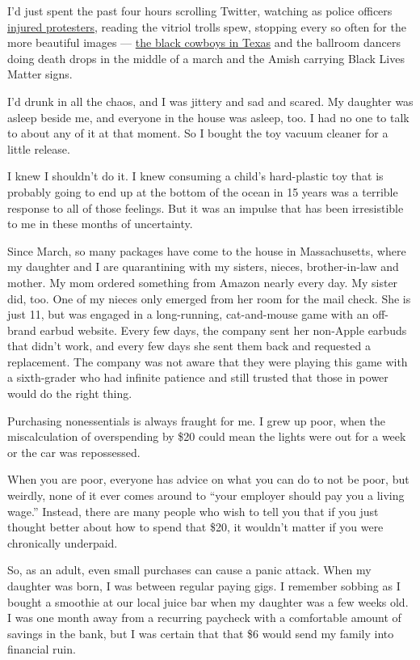 I'd just spent the past four hours scrolling Twitter, watching as police
officers
\href{https://www.nytimes.com/2020/06/05/us/police-violence-george-floyd.html}{injured
protesters}, reading the vitriol trolls spew, stopping every so often
for the more beautiful images ---
\href{https://www.newsweek.com/black-texas-cowboys-horseback-protest-george-floyds-death-viral-video-1508378}{the
black cowboys in Texas} and the ballroom dancers doing death drops in
the middle of a march and the Amish carrying Black Lives Matter signs.

I'd drunk in all the chaos, and I was jittery and sad and scared. My
daughter was asleep beside me, and everyone in the house was asleep,
too. I had no one to talk to about any of it at that moment. So I bought
the toy vacuum cleaner for a little release.

I knew I shouldn't do it. I knew consuming a child's hard-plastic toy
that is probably going to end up at the bottom of the ocean in 15 years
was a terrible response to all of those feelings. But it was an impulse
that has been irresistible to me in these months of uncertainty.

Since March, so many packages have come to the house in Massachusetts,
where my daughter and I are quarantining with my sisters, nieces,
brother-in-law and mother. My mom ordered something from Amazon nearly
every day. My sister did, too. One of my nieces only emerged from her
room for the mail check. She is just 11, but was engaged in a
long-running, cat-and-mouse game with an off-brand earbud website. Every
few days, the company sent her non-Apple earbuds that didn't work, and
every few days she sent them back and requested a replacement. The
company was not aware that they were playing this game with a
sixth-grader who had infinite patience and still trusted that those in
power would do the right thing.

Purchasing nonessentials is always fraught for me. I grew up poor, when
the miscalculation of overspending by \$20 could mean the lights were
out for a week or the car was repossessed.

When you are poor, everyone has advice on what you can do to not be
poor, but weirdly, none of it ever comes around to ``your employer
should pay you a living wage.'' Instead, there are many people who wish
to tell you that if you just thought better about how to spend that
\$20, it wouldn't matter if you were chronically underpaid.

So, as an adult, even small purchases can cause a panic attack. When my
daughter was born, I was between regular paying gigs. I remember sobbing
as I bought a smoothie at our local juice bar when my daughter was a few
weeks old. I was one month away from a recurring paycheck with a
comfortable amount of savings in the bank, but I was certain that that
\$6 would send my family into financial ruin.

